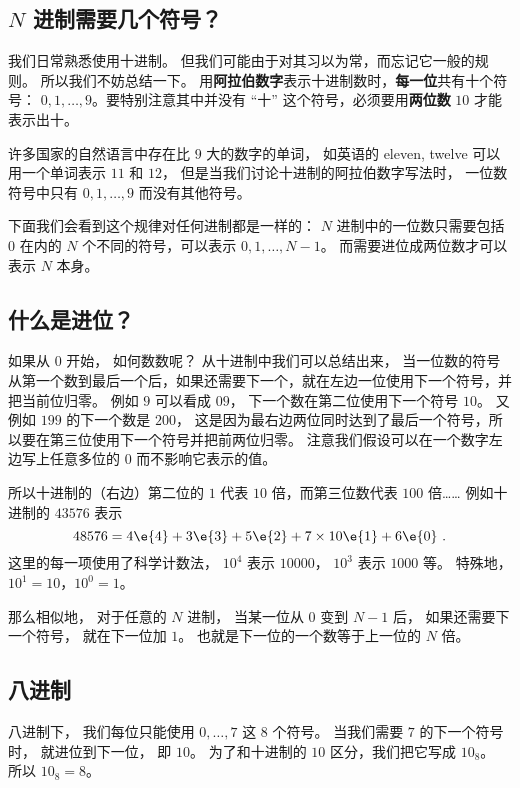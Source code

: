 
\begin{issues}
\issueDraft
\end{issues}

\subsection{$N$ 进制需要几个符号？}
我们日常熟悉使用十进制。 但我们可能由于对其习以为常，而忘记它一般的规则。 所以我们不妨总结一下。 用\textbf{阿拉伯数字}表示十进制数时，\textbf{每一位}共有十个符号： $0,1,\dots, 9$。要特别注意其中并没有 “十” 这个符号，必须要用\textbf{两位数} $10$ 才能表示出十。

许多国家的自然语言中存在比 $9$ 大的数字的单词， 如英语的 eleven, twelve 可以用一个单词表示 $11$ 和 $12$， 但是当我们讨论十进制的阿拉伯数字写法时， 一位数符号中只有 $0,1,\dots, 9$ 而没有其他符号。 

下面我们会看到这个规律对任何进制都是一样的： $N$ 进制中的一位数只需要包括 $0$ 在内的 $N$ 个不同的符号，可以表示 $0,1,\dots,N-1$。 而需要进位成两位数才可以表示 $N$ 本身。

\subsection{什么是进位？}
如果从 $0$ 开始， 如何数数呢？ 从十进制中我们可以总结出来， 当一位数的符号从第一个数到最后一个后，如果还需要下一个，就在左边一位使用下一个符号，并把当前位归零。 例如 $9$ 可以看成 $09$， 下一个数在第二位使用下一个符号 $10$。 又例如 $199$ 的下一个数是 $200$， 这是因为最右边两位同时达到了最后一个符号，所以要在第三位使用下一个符号并把前两位归零。 注意我们假设可以在一个数字左边写上任意多位的 $0$ 而不影响它表示的值。

所以十进制的（右边）第二位的 $1$ 代表 $10$ 倍，而第三位数代表 $100$ 倍…… 例如十进制的 $43576$ 表示
\begin{equation}\label{eq_Binary_1}
48576 = 4\e{4} + 3\e{3} + 5\e{2} + 7\times 10\e{1} + 6\e{0}~.
\end{equation}
这里的每一项使用了科学计数法，%
$10^4$ 表示 $10000$， $10^3$ 表示 $1000$ 等。 特殊地， $10^1=10$，$10^0=1$。

那么相似地， 对于任意的 $N$ 进制， 当某一位从 $0$ 变到 $N-1$ 后， 如果还需要下一个符号， 就在下一位加 $1$。 也就是下一位的一个数等于上一位的 $N$ 倍。

\subsection{八进制}
八进制下， 我们每位只能使用 $0,\dots,7$ 这 $8$ 个符号。 当我们需要 $7$ 的下一个符号时， 就进位到下一位， 即 $10$。 为了和十进制的 $10$ 区分，我们把它写成 $10_\text{8}$。 所以 $10_\text{8} = 8$。

